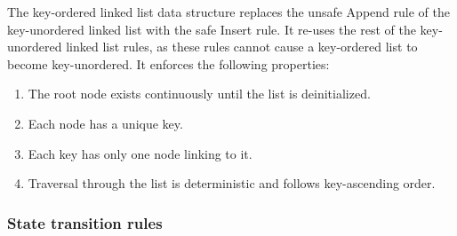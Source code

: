 \documentclass[../midgard.tex]{subfiles}
\begin{document}
The key-ordered linked list data structure replaces the unsafe Append rule of the key-unordered linked list with the safe Insert rule.
It re-uses the rest of the key-unordered linked list rules, as these rules cannot cause a key-ordered list to become key-unordered.
It enforces the following properties:
\begin{enumerate}
    \item The root node exists continuously until the list is deinitialized.
    \item Each node has a unique key.
    \item Each key has only one node linking to it.
    \item Traversal through the list is deterministic and follows key-ascending order.
\end{enumerate}

\subsubsection{State transition rules}
\label{h:key-ordered-list-state-transition-rules}
\end{document}
